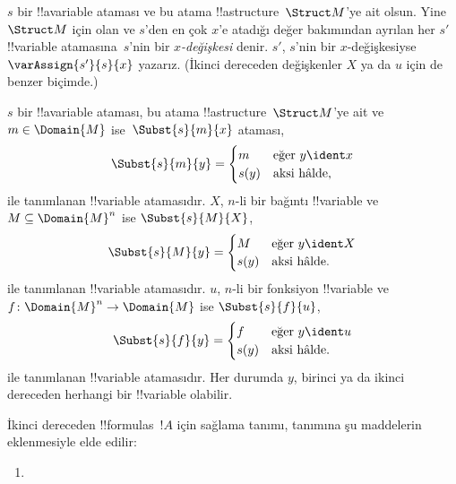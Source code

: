 \begin{defn}[$x$-değişkesi]
$s$ bir !!a{variable} ataması ve bu atama !!a{structure}~$\Struct M$'ye ait olsun.
Yine~$\Struct M$ için olan ve $s$'den en çok $x$'e atadığı değer bakımından
ayrılan her $s'$ !!{variable}
atamasına~$s$'nin bir \emph{$x$-değişkesi} denir. $s'$, $s$'nin
bir $x$-değişkesiyse $\varAssign{s'}{s}{x}$ yazarız. (İkinci dereceden
değişkenler $X$ ya da $u$ için de benzer biçimde.)
\end{defn}

\begin{defn}
  $s$ bir !!a{variable} ataması, bu atama !!a{structure}~$\Struct M$'ye ait ve
  $m \in \Domain{M}$ ise~$\Subst{s}{m}{x}$ ataması,
  \[\Subst{s}{m}{y} = \begin{cases}
    m & \text{eğer } y \ident x\\
    s(y) & \text{aksi hâlde},
  \end{cases}\]
  ile tanımlanan !!{variable} atamasıdır.
  $X$, $n$-li bir bağıntı !!{variable} ve $M \subseteq \Domain{M}^n$ ise
  $\Subst{s}{M}{X}$,
  \[\Subst{s}{M}{y} = \begin{cases}
    M & \text{eğer } y \ident X\\
    s(y) & \text{aksi hâlde}.
  \end{cases}\]
  ile tanımlanan !!{variable} atamasıdır.
  $u$, $n$-li bir fonksiyon !!{variable} ve
  $f\colon \Domain{M}^n \to \Domain{M}$ ise $\Subst{s}{f}{u}$,
  \[\Subst{s}{f}{y} = \begin{cases}
    f & \text{eğer } y \ident u\\
    s(y) & \text{aksi hâlde}.
  \end{cases}\]
  ile tanımlanan !!{variable} atamasıdır. Her durumda $y$, birinci
  ya da ikinci dereceden herhangi bir !!{variable} olabilir.
\end{defn}

\begin{defn}[Sağlama]
İkinci dereceden !!{formula}s~$!A$ için sağlama tanımı,
 tanımına şu maddelerin eklenmesiyle
elde edilir:
\begin{enumerate}
\item {}



\end{enumerate}
\end{defn}

